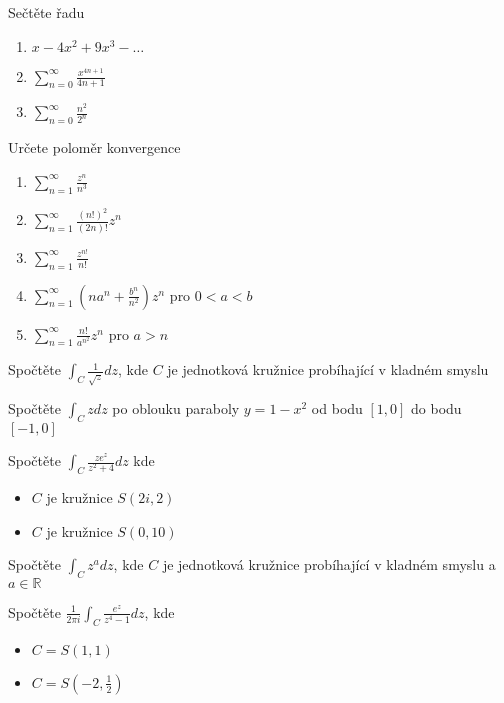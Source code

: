 \begin{multicols}{2}
\separator

Sečtěte řadu
\begin{enumerate}
\item $x - 4x^2 + 9x^3 - \ldots$
\item $\sum_{n=0}^\infty \frac{x^{4n+1}}{4n+1}$
\item $\sum_{n=0}^\infty \frac{n^2}{2^n}$
\end{enumerate}

\separator

Určete poloměr konvergence
\begin{enumerate}
\item $\sum_{n=1}^\infty \frac{z^n}{n^3}$
\item $\sum_{n=1}^\infty \frac{(n!)^2}{(2n)!} z^n$
\item $\sum_{n=1}^\infty \frac{z^{n!}}{n!}$
\item $\sum_{n=1}^\infty \left( na^n + \frac{b^n}{n^2} \right) z^n$ pro $0 < a < b$
\item $\sum_{n=1}^\infty \frac{n!}{a^{n^2}} z^n$ pro $a > n$
\end{enumerate}

\separator

Spočtěte $\int_C \frac{1}{\sqrt{z}} dz$, kde $C$ je jednotková kružnice probíhající v kladném smyslu

\separator

Spočtěte $\int_C z dz$ po oblouku paraboly $y = 1-x^2$ od bodu $[1,0]$ do bodu $[-1,0]$

\separator

Spočtěte $\int_C \frac{z e^z}{z^2 + 4} dz$ kde
\begin{itemize}
\item $C$ je kružnice $S(2i, 2)$
\item $C$ je kružnice $S(0,10)$
\end{itemize}

\separator 

Spočtěte $\int_C z^a dz$, kde $C$ je jednotková kružnice probíhající v kladném smyslu a $a \in \mathbb{R}$

\separator

Spočtěte $\frac{1}{2 \pi i} \int_C \frac{e^z}{z^4 - 1} dz$, kde
\begin{itemize}
\item $C = S(1,1)$
\item $C = S \left(-2,\frac{1}{2} \right)$
\end{itemize}

\separator


\end{multicols}
